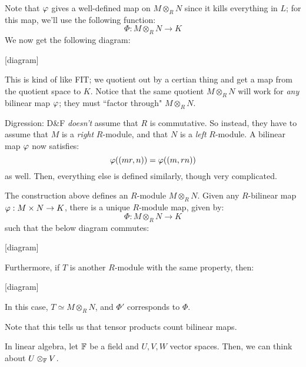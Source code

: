 Note that $ \operatorname{\varphi} $ gives a well-defined map on $ M \otimes_{R} N $ since
it kills everything in $ L $; for this map, we'll use the following function:
\begin{equation*}
    \Phi: M \otimes_{R} N \rightarrow K
\end{equation*}
We now get the following diagram:

[diagram]

This is kind of like FIT; we quotient out by a certian thing and get a map
from the quotient space to $ K $. Notice that the same quotient
$ M \otimes_{R} N $ will work for \textit{any} bilinear map $ \operatorname{\varphi} $;
they must ``factor through" $ M \otimes_{R} N $.

Digression: D\&F \textit{doesn't} assume that $ R $ is commutative. So instead,
they have to assume that $ M $ is a \textit{right} $ R $-module, and that
$ N $ is a \textit{left} $ R $-module. A bilinear map $ \operatorname{\varphi} $ now satisfies:
\begin{equation*}
    \operatorname{\varphi}((mr, n)) = \operatorname{\varphi}((m, rn))
\end{equation*}
as well. Then, everything else is defined similarly, though very complicated.

\begin{thm}
    The construction above defines an $ R $-module $ M \otimes_{R} N $. \vsp
    Given any $ R $-bilinear map $ \operatorname{\varphi} : M \times N \rightarrow K $,
    there is a unique $ R $-module map, given by:
    \begin{equation*}
        \Phi: M \otimes_{R} N \rightarrow K
    \end{equation*}
    such that the below diagram commutes:

    [diagram]

    Furthermore, if $ T $ is another $ R $-module with the same property, then:

    [diagram]

    In this case, $ T \simeq M \otimes_{R} N $, and $ \Phi' $
    corresponds to $ \Phi $.
\end{thm}

Note that this tells us that tensor products count bilinear maps.

In linear algebra, let $ \mathbb{F} $ be a field and $ U, V, W $ vector spaces.
Then, we can think about $ U \otimes_{\mathbb{F}} V $.

